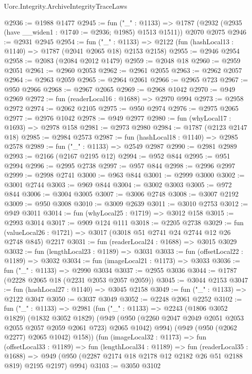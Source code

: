 \begin{lexlean}{Uorc.Integrity.ArchiveIntegrityTraceLaws}
\begin{coremodule}
@2936 := @1988 @1477
@2945 := fun ("_" : @1133) =>
  @1787 (@2932 (@2935 (have __widen1 : @1740 := @2936; @1985) @1513 @1511)) @2070 @2075
@2946 := @2931 @2945
@2954 := fun ("_" : @1133) =>
  @2122 (fun (hashLocal13 : @1140) => @1787 (@2041 @2065 @18) @2153 @2158)
@2955 := @2946 @2954
@2958 := @2083 (@2084 @2012 @1479)
@2959 := @2048 @18
@2960 := @2959 @2051
@2961 := @2960 @2053
@2962 := @2961 @2055
@2963 := @2962 @2057
@2964 := @2963 @2059
@2965 := @2964 @2061
@2966 := @2965 @723
@2967 := @950 @2966
@2968 := @2967 @2065
@2969 := @2968 @1042
@2970 := @949 @2969
@2972 := fun (readerLocal16 : @1688) => @2970 @994
@2973 := @2958 @2972
@2974 := @2062 @2105
@2975 := @950 @2974
@2976 := @2975 @2065
@2977 := @2976 @1042
@2978 := @949 @2977
@2980 := fun (whyLocal17 : @1693) => @2978 @158
@2981 := @2973 @2980
@2984 := @1787 (@2123 @2147 @18)
@2985 := @2984 @2573
@2987 := fun (hashLocal18 : @1140) => @2985 @2578
@2989 := fun ("_" : @1133) => @2549 @2987
@2990 := @2981 @2989
@2993 := @2166 (@2167 @2195 @12)
@2994 := @952 @844
@2995 := @951 @2994
@2996 := @2995 @2738
@2997 := @957 @844
@2998 := @2996 @2997
@2999 := @2998 @2741
@3000 := @963 @844
@3001 := @2999 @3000
@3002 := @3001 @2744
@3003 := @969 @844
@3004 := @3002 @3003
@3005 := @972 @844
@3006 := @3004 @3005
@3007 := @3006 @2748
@3008 := @3007 @2192
@3009 := @950 @3008
@3010 := @3009 @2639
@3011 := @3010 @2753
@3012 := @949 @3011
@3014 := fun (whyLocal25 : @1719) => @3012 @158
@3015 := @2993 @3014
@3017 := @909 @124 @111
@3018 := @2205 @2738
@3029 := fun (valueLocal26 : @1721) => @3017 (@3018 @51 @2741 @24 @2744 @12 @26 @2748 @845) @2217
@3031 := fun (readerLocal24 : @1688) => @3015 @3029
@3032 := fun (lengthLocal23 : @1189) => @3031
@3033 := fun (offsetLocal22 : @1189) => @3032
@3034 := fun (imageLocal21 : @1173) => @3033
@3036 := fun ("_" : @1133) => @2990 @3034
@3037 := @2955 @3036
@3044 := @1787 (@2228 @2065 @18 (@2231 @2053 @2057 @2059))
@3045 := @3044 @2153
@3047 := fun (hashLocal27 : @1140) => @3045 @2158
@3049 := fun ("_" : @1133) => @2122 @3047
@3050 := @3037 @3049
@3052 := @2248 @2061 @2252
@3102 := fun ("_" : @1133) =>
  @2981
    (fun ("_" : @1133) =>
    @2243
      (@1806 @3052 @1829)
      (@1832 @3052 @1829)
      (@949 (@950 (@2260 @2047 @2049 @2051 @2053 @2055 @2057 @2059 @2061 @723) @2065 @1042) @994)
      (@949 (@950 (@2062 @2277) @2065 @1042) @158))
    (fun (imageLocal32 : @1173) =>
    fun (offsetLocal33 : @1189) =>
    fun (lengthLocal34 : @1189) =>
    fun (readerLocal35 : @1688) =>
    @949 (@950 (@2287 @2174 @18 @2178 @12 @2182 @26 @51 @2188 @819) @2195 @2197) @994)
@3103 := @3050 @3102

\end{coremodule}
\end{lexlean}
